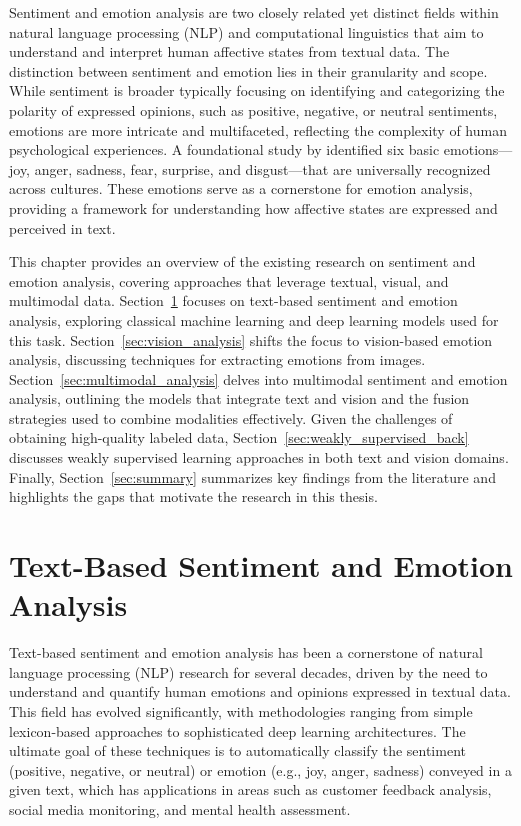 Sentiment and emotion analysis are two closely related yet distinct fields within natural language processing (NLP) and computational linguistics that aim to understand and interpret human affective states from textual data. The distinction between sentiment and emotion lies in their granularity and scope. While sentiment is broader typically focusing on identifying and categorizing the polarity of expressed opinions, such as positive, negative, or neutral sentiments, emotions are more intricate and multifaceted, reflecting the complexity of human psychological experiences. A foundational study by \citet{ekman1992there} identified six basic emotions—joy, anger, sadness, fear, surprise, and disgust—that are universally recognized across cultures. These emotions serve as a cornerstone for emotion analysis, providing a framework for understanding how affective states are expressed and perceived in text.
\newline

This chapter provides an overview of the existing research on sentiment and emotion analysis, covering approaches that leverage textual, visual, and multimodal data. Section~\ref{sec:text_analysis} focuses on text-based sentiment and emotion analysis, exploring classical machine learning and deep learning models used for this task. Section~\ref{sec:vision_analysis} shifts the focus to vision-based emotion analysis, discussing techniques for extracting emotions from images. Section~\ref{sec:multimodal_analysis} delves into multimodal sentiment and emotion analysis, outlining the models that integrate text and vision and the fusion strategies used to combine modalities effectively. Given the challenges of obtaining high-quality labeled data, Section~\ref{sec:weakly_supervised_back} discusses weakly supervised learning approaches in both text and vision domains. Finally, Section~\ref{sec:summary} summarizes key findings from the literature and highlights the gaps that motivate the research in this thesis.




\section{Text-Based Sentiment and Emotion Analysis}
\label{sec:text_analysis}

Text-based sentiment and emotion analysis has been a cornerstone of natural language processing (NLP) research for several decades, driven by the need to understand and quantify human emotions and opinions expressed in textual data. This field has evolved significantly, with methodologies ranging from simple lexicon-based approaches to sophisticated deep learning architectures. The ultimate goal of these techniques is to automatically classify the sentiment (positive, negative, or neutral) or emotion (e.g., joy, anger, sadness) conveyed in a given text, which has applications in areas such as customer feedback analysis, social media monitoring, and mental health assessment.

